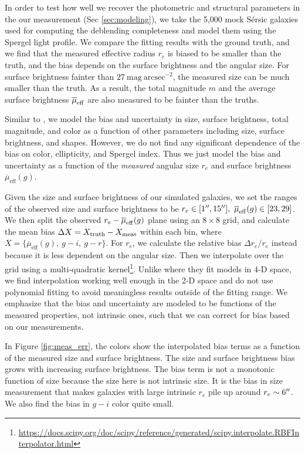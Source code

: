 \documentclass[twocolumn,astrosymb,twocolappendix]{aastex631}
\newcommand{\sbunit}{\mathrm{mag\ arcsec}^{-2}}
\newcommand{\sbeff}{\overline{\mu}_{\mathrm{eff}}(g)}
\newcommand{\sersic}{S\'ersic}
\begin{document}
\begin{CJK*}{UTF8}{gbsn}
In order to test how well we recover the photometric and structural parameters in the our measurement (Sec \ref{sec:modeling}), we take the 5,000 mock \sersic{} galaxies used for computing the deblending completeness and model them using the Spergel light profile. We compare the fitting results with the ground truth, and we find that the measured effective radius $r_e$ is biased to be smaller than the truth, and the bias depends on the surface brightness and the angular size. For surface brightness fainter than $27\ \sbunit$, the measured size can be much smaller than the truth. As a result, the total magnitude $m$ and the average surface brightness $\overline{\mu}_{\rm eff}$ are also measured to be fainter than the truths. 

Similar to \citet{Zaritsky2021}, we model the bias and uncertainty in size, surface brightness, total magnitude, and color as a function of other parameters including size, surface brightness, and shapes. However, we do not find any significant dependence of the bias on color, ellipticity, and Spergel index. Thus we just model the bias and uncertainty as a function of the \textit{measured} angular size $r_e$ and surface brightness $\sbeff$.

Given the size and surface brightness of our simulated galaxies, we set the ranges of the observed size and surface brightness to be $r_e\in[1\arcsec, 15\arcsec],\ \sbeff\in[23, 29]$. We then split the observed $r_e-\overline{\mu}_{\rm eff}(g)$ plane using an $8\times 8$ grid, and calculate the mean bias $\Delta X = X_{\rm truth} - X_{\rm meas}$ within each bin, where $X=\{\sbeff,\ g-i,\ g-r\}$. For $r_e$, we calculate the relative bias $\Delta r_e / r_e$ instead because it is less dependent on the angular size. Then we interpolate over the grid using a multi-quadratic kernel\footnote{\url{https://docs.scipy.org/doc/scipy/reference/generated/scipy.interpolate.RBFInterpolator.html}}. Unlike \citet{Zaritsky2021} where they fit models in 4-D space, we find interpolation working well enough in the 2-D space and do not use polynomial fitting to avoid meaningless results outside of the fitting range. We emphasize that the bias and uncertainty are modeled to be functions of the measured properties, not intrinsic ones, such that we can correct for bias based on our measurements. 

In Figure \ref{fig:meas_err}, the colors show the interpolated bias terms as a function of the measured size and surface brightness. The size and surface brightness bias grows with increasing surface brightness. The bias term is not a monotonic function of size because the size here is not intrinsic size. It is the bias in size measurement that makes galaxies with large intrinsic $r_e$ pile up around $r_e\sim 6\mbox{$^{\prime\prime}$}$. We also find the bias in $g-i$ color quite small. 


\end{CJK*}
\end{document}
